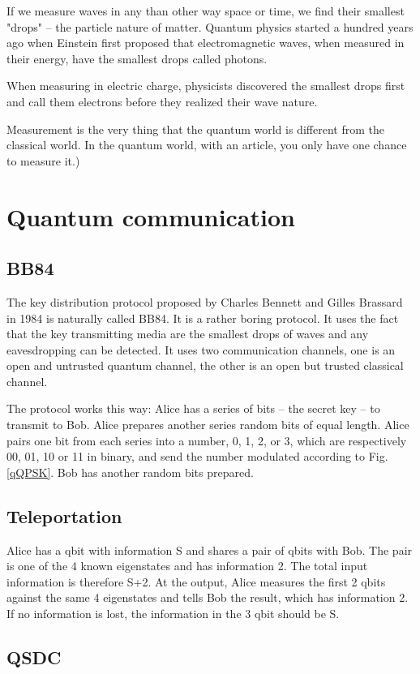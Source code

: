 \documentclass{book}
\begin{document}
If we measure waves in any than other way space or time, we find their smallest "drops" -- the particle nature of matter. Quantum physics started a hundred years ago when Einstein first proposed that electromagnetic waves, when measured in their energy, have the smallest drops called photons.

When measuring in electric charge, physicists discovered the smallest drops first and call them electrons before they realized their wave nature.

Measurement is the very thing that the quantum world is different from the classical world. In the quantum world, with an article, you only have one chance to measure it.)

\chapter{Quantum communication}
\section{BB84}
The key distribution protocol proposed by Charles Bennett and Gilles Brassard in 1984 is naturally called BB84. It is a rather boring protocol. It uses the fact that the key transmitting media are the smallest drops of waves and any eavesdropping can be detected. It uses two communication channels, one is an open and untrusted quantum channel, the other is an open but trusted classical channel.

The protocol works this way: Alice has a series of bits -- the secret key -- to transmit to Bob. Alice prepares another series random bits of equal length. Alice pairs one bit from each series into a number, 0, 1, 2, or 3, which are respectively 00, 01, 10 or 11 in binary, and send the number modulated according to Fig. \ref{qQPSK}. Bob has another random bits prepared. 

\section{Teleportation}
Alice has a qbit with information S and shares a pair of qbits with Bob. The pair is one of the 4 known eigenstates and has information 2. The total input information is therefore S+2. At the output, Alice measures the first 2 qbits against the same 4 eigenstates and tells Bob the result, which has information 2. If no information is lost, the information in the 3 qbit should be S.

\section{QSDC}
\end{document}
